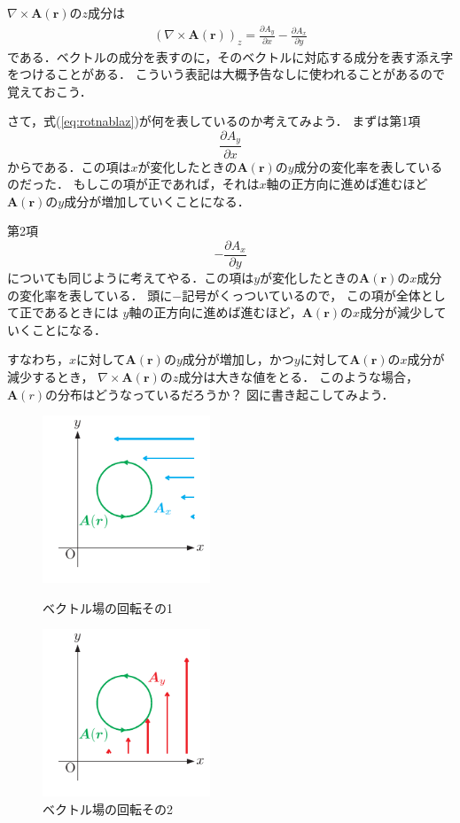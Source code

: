 $\nabla \times \bm{A}(\bm{r})$の$z$成分は
\begin{eqnarray}
(\nabla \times \bm{A}(\bm{r}))_z = \frac{\partial A_y}{\partial x} - \frac{\partial A_x}{\partial y} 
\label{eq:rotnablaz}
\end{eqnarray}
である．ベクトルの成分を表すのに，そのベクトルに対応する成分を表す添え字をつけることがある．
こういう表記は大概予告なしに使われることがあるので覚えておこう．

さて，式(\ref{eq:rotnablaz})が何を表しているのか考えてみよう．
まずは第1項
$$
\frac{\partial A_y}{\partial x}
$$
からである．この項は$x$が変化したときの$\bm{A}(\bm{r})$の$y$成分の変化率を表しているのだった．
もしこの項が正であれば，それは$x$軸の正方向に進めば進むほど$\bm{A}(\bm{r})$の$y$成分が増加していくことになる．

第2項
$$
-\frac{\partial A_x}{\partial y}
$$
についても同じように考えてやる．この項は$y$が変化したときの$\bm{A}(\bm{r})$の$x$成分の変化率を表している．
頭に$-$記号がくっついているので，
この項が全体として正であるときには
$y$軸の正方向に進めば進むほど，$\bm{A}(\bm{r})$の$x$成分が減少していくことになる．

すなわち，$x$に対して$\bm{A}(\bm{r})$の$y$成分が増加し，かつ$y$に対して$\bm{A}(\bm{r})$の$x$成分が減少するとき，
$\nabla \times \bm{A}(\bm{r})$の$z$成分は大きな値をとる．
このような場合，$\bm{A}(r)$の分布はどうなっているだろうか？ 図に書き起こしてみよう．
\begin{figure}[h]
 \begin{minipage}{0.5\hsize}
  \begin{center}
   \includegraphics[width=5cm]{picture/vecterana5}
  \end{center}
 \caption{ベクトル場の回転その1}
 \label{fig:vecrot1}
\end{minipage}
\begin{minipage}{0.5\hsize}
  \begin{center}
   \includegraphics[width=5cm]{picture/vecterana6}
  \end{center}
 \caption{ベクトル場の回転その2}
 \label{fig:vecrot2}
\end{minipage}
\end{figure} \\

